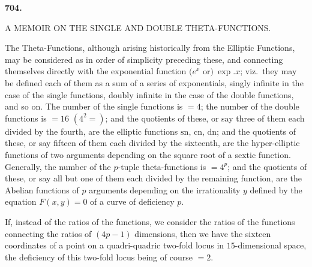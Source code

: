 \documentclass[11pt,a4paper]{book}
\providecommand{\sn}{\mathrm{sn}}
\providecommand{\cn}{\mathrm{cn}}
\providecommand{\dn}{\mathrm{dn}}
\begin{document}
\vspace{2em}

\begin{center}
\large\bfseries 704.\par\vspace{0.3em}
A MEMOIR ON THE SINGLE AND DOUBLE THETA-FUNCTIONS.\par\vspace{0.5em}
\normalsize{}
\end{center}

\vspace{1em}

The Theta-Functions, although arising historically from the Elliptic Functions, may be considered as in order of simplicity preceding these, and connecting themselves directly with the exponential function $(e^x$ or$)\ \exp. x$; viz.\ they may be defined each of them as a sum of a series of exponentials, singly infinite in the case of the single functions, doubly infinite in the case of the double functions, and so on. The number of the single functions is $= 4$; the number of the double functions is $= 16$ $(4^2 =)$; and the quotients of these, or say three of them each divided by the fourth, are the elliptic functions $\sn$, $\cn$, $\dn$; and the quotients of these, or say fifteen of them each divided by the sixteenth, are the hyper-elliptic functions of two arguments depending on the square root of a sextic function. Generally, the number of the $p$-tuple theta-functions is $= 4^p$; and the quotients of these, or say all but one of them each divided by the remaining function, are the Abelian functions of $p$ arguments depending on the irrationality $y$ defined by the equation $F(x, y) = 0$ of a curve of deficiency $p$.

If, instead of the ratios of the functions, we consider the ratios of the functions connecting the ratios of $(4p - 1)$ dimensions, then we have the sixteen coordinates of a point on a quadri-quadric two-fold locus in $15$-dimensional space, the deficiency of this two-fold locus being of course $= 2$.

\vspace{1em}
\end{document}
